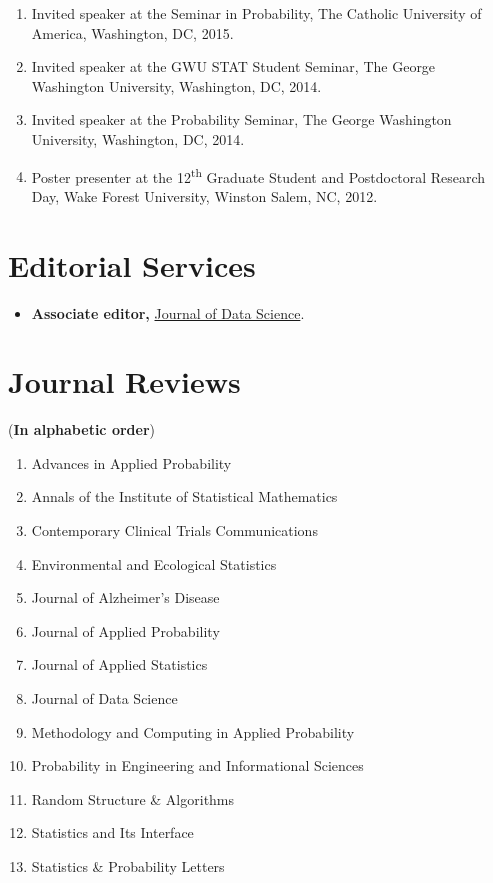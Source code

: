 \documentclass[margin]{res}
\begin{document}
\begin{resume}
\begin{enumerate}
	\item Invited speaker at the Seminar in Probability, The Catholic University of America, Washington, DC, 2015.
	\item Invited speaker at the GWU STAT Student Seminar, The George Washington University, Washington, DC, 2014.
	\item Invited speaker at the Probability Seminar, The George Washington University, Washington, DC, 2014.
	\item Poster presenter at the 12\textsuperscript{th} Graduate Student and Postdoctoral Research Day, Wake Forest University, Winston Salem, NC, 2012.
\end{enumerate}

\section{Editorial Services}
\begin{itemize}
	\item \textbf{Associate editor,} 
	\href{https://jds-online.org/journal/JDS}{Journal of Data 
	Science}.
\end{itemize}

\section{Journal Reviews}
({\bf In alphabetic order})
\begin{enumerate}
	\item Advances in Applied Probability
	\item Annals of the Institute of Statistical Mathematics
	\item Contemporary Clinical Trials Communications
	\item Environmental and Ecological Statistics
	\item Journal of Alzheimer's Disease
	\item Journal of Applied Probability
	\item Journal of Applied Statistics 
	\item Journal of Data Science
	\item Methodology and Computing in Applied Probability
	\item Probability in Engineering and Informational Sciences
	\item Random Structure \& Algorithms
	\item Statistics and Its Interface
	\item Statistics \& Probability Letters
\end{enumerate}


\end{resume}
\end{document}
